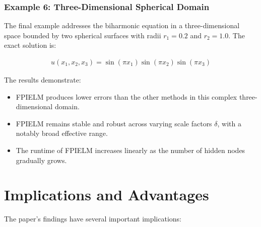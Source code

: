 \documentclass[11pt]{article}
\begin{document}
\subsubsection{Example 6: Three-Dimensional Spherical Domain}

The final example addresses the biharmonic equation in a three-dimensional space bounded by two spherical surfaces with radii $r_1 = 0.2$ and $r_2 = 1.0$. The exact solution is:

\begin{align}
    u(x_1, x_2, x_3) = \sin(\pi x_1) \sin(\pi x_2) \sin(\pi x_3)
\end{align}

The results demonstrate:
\begin{itemize}
    \item FPIELM produces lower errors than the other methods in this complex three-dimensional domain.
    \item FPIELM remains stable and robust across varying scale factors $\delta$, with a notably broad effective range.
    \item The runtime of FPIELM increases linearly as the number of hidden nodes gradually grows.
\end{itemize}

\section{Implications and Advantages}

The paper's findings have several important implications:
\end{document}
